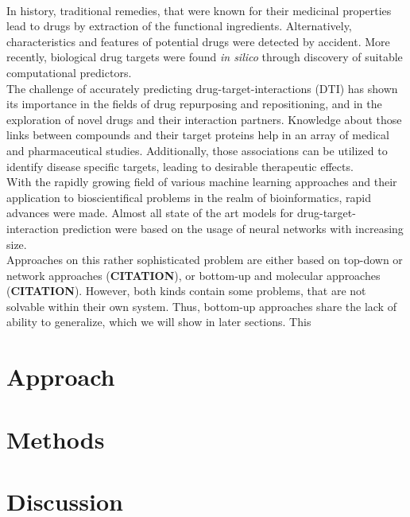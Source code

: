 \documentclass{bioinfo}
\begin{document}
\cite{Survey2018}\\
In history, traditional remedies, that were known for their medicinal properties lead to drugs by extraction of the functional ingredients. Alternatively, characteristics and features of potential drugs were detected by accident. More recently, biological drug targets were found \textit{in silico} through discovery of suitable computational predictors.\\
The challenge of accurately predicting drug-target-interactions (DTI) has shown its importance in the fields of drug repurposing and repositioning, and in the exploration of novel drugs and their interaction partners. Knowledge about those links between compounds and their target proteins help in an array of medical and pharmaceutical studies. Additionally, those associations can be utilized to identify disease specific targets, leading to desirable therapeutic effects.\\
With the rapidly growing field of various machine learning approaches and their application to bioscientifical problems in the realm of bioinformatics, rapid advances were made. Almost all state of the art models for drug-target-interaction prediction were based on the usage of neural networks with increasing size.\\
Approaches on this rather sophisticated problem are either based on top-down or network approaches (\textbf{CITATION}), or bottom-up and molecular approaches (\textbf{CITATION}). However, both kinds contain some problems, that are not solvable within their own system. Thus, bottom-up approaches share the lack of ability to generalize, which we will show in later sections. This 


\section{Approach}


\section{Methods}



\section{Discussion}
\end{document}
